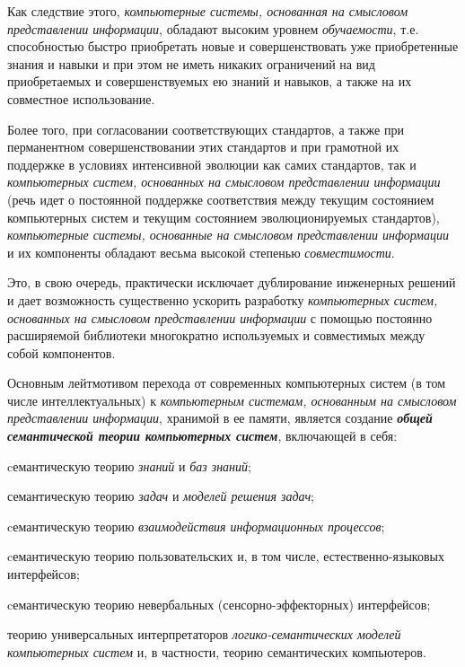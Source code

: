 \begin{SCn}
{	Как следствие этого, \textit{компьютерные системы, основанная на смысловом представлении информации}, обладают высоким уровнем \textit{обучаемости}, т.е. способностью быстро приобретать новые и совершенствовать уже приобретенные знания и навыки и при этом не иметь никаких ограничений на вид приобретаемых и совершенствуемых ею знаний и навыков, а также на их совместное использование.
	
	Более того, при согласовании соответствующих стандартов, а также при перманентном совершенствовании этих стандартов и при грамотной их поддержке в условиях интенсивной эволюции как самих стандартов, так и \textit{компьютерных систем, основанных на смысловом представлении информации} (речь идет о постоянной поддержке соответствия между текущим состоянием компьютерных систем и текущим состоянием эволюционируемых стандартов), \textit{компьютерные системы, основанные на смысловом представлении информации} и их компоненты обладают весьма высокой степенью \textit{совместимости}.
	
	Это, в свою очередь, практически исключает дублирование инженерных решений и дает возможность существенно ускорить разработку \textit{компьютерных систем, основанных на смысловом представлении информации} с помощью постоянно расширяемой библиотеки многократно используемых и совместимых между собой компонентов. 
	
	Основным лейтмотивом перехода от современных компьютерных систем (в том числе интеллектуальных) к \textit{компьютерным системам, основанным на смысловом представлении информации}, хранимой в ее памяти, является создание \textbf{\textit{общей семантической теории компьютерных систем}}, включающей в себя:
	\begin{scnitemize}
		\item cемантическую теорию \textit{знаний} и \textit{баз знаний};
		\item семантическую теорию \textit{задач} и \textit{моделей решения задач};
		\item cемантическую теорию \textit{взаимодействия информационных процессов};
		\item cемантическую теорию пользовательских и, в том числе, естественно-языковых интерфейсов;
		\item cемантическую теорию невербальных (сенсорно-эффекторных) интерфейсов;
		\item теорию универсальных интерпретаторов \textit{логико-семантических моделей компьютерных систем} и, в частности, теорию семантических компьютеров.
	\end{scnitemize}
	
}
\end{SCn}
